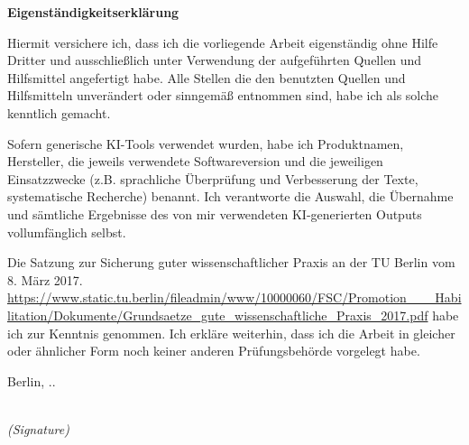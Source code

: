 \newpage

\thispagestyle{empty}
\begin{large}
\noindent
\textbf{Eigenständigkeitserklärung}
\vspace*{1.5cm}

\noindent
Hiermit versichere ich, dass ich die vorliegende Arbeit eigenständig ohne Hilfe Dritter und ausschließlich unter
Verwendung der aufgeführten Quellen und Hilfsmittel angefertigt habe. Alle Stellen die den benutzten Quellen
und Hilfsmitteln unverändert oder sinngemäß entnommen sind, habe ich als solche kenntlich gemacht. 
\newline

\noindent
Sofern generische KI-Tools verwendet wurden, habe ich Produktnamen, Hersteller, die jeweils verwendete
Softwareversion und die jeweiligen Einsatzzwecke (z.B. sprachliche Überprüfung und Verbesserung der Texte,
systematische Recherche) benannt. Ich verantworte die Auswahl, die Übernahme und sämtliche Ergebnisse
des von mir verwendeten KI-generierten Outputs vollumfänglich selbst.
\newline

\noindent
Die Satzung zur Sicherung guter wissenschaftlicher Praxis an der TU Berlin vom 8. März 2017.
\url{https://www.static.tu.berlin/fileadmin/www/10000060/FSC/Promotion___Habilitation/Dokumente/Grundsaetze_gute_wissenschaftliche_Praxis_2017.pdf} habe ich zur Kenntnis genommen.
Ich erkläre weiterhin, dass ich die Arbeit in gleicher oder ähnlicher Form noch keiner anderen Prüfungsbehörde
vorgelegt habe.
\vspace{2cm}

\noindent
Berlin, \the\day.\the\month.\the\year \\

\vspace{3cm}

\hspace*{7cm}%
\dotfill\\
\hspace*{8.5cm}%
\textit{(Signature)}

\end{large}
